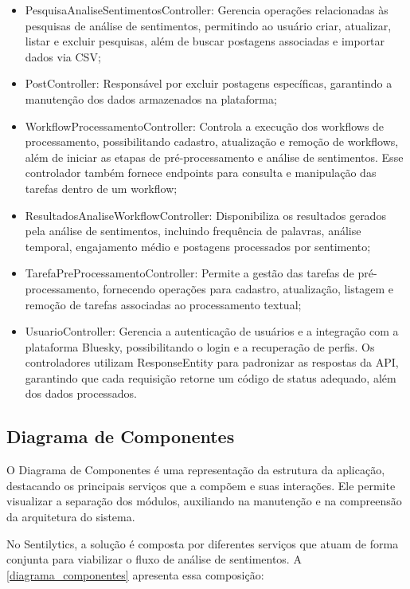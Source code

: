 \documentclass[
	12pt,				%
	oneside,			%
	a4paper,			%
	english,			%
	french,				%
	spanish,			%
	brazil				%
	]{abntex2}
\begin{document}
\begin{itemize}
\tightlist
\item
  PesquisaAnaliseSentimentosController: Gerencia operações relacionadas
  às pesquisas de análise de sentimentos, permitindo ao usuário criar,
  atualizar, listar e excluir pesquisas, além de buscar postagens
  associadas e importar dados via CSV;
\item
  PostController: Responsável por excluir postagens específicas,
  garantindo a manutenção dos dados armazenados na plataforma;
\item
  WorkflowProcessamentoController: Controla a execução dos workflows de
  processamento, possibilitando cadastro, atualização e remoção de
  workflows, além de iniciar as etapas de pré-processamento e análise de
  sentimentos. Esse controlador também fornece endpoints para consulta e
  manipulação das tarefas dentro de um workflow;
\item
  ResultadosAnaliseWorkflowController: Disponibiliza os resultados
  gerados pela análise de sentimentos, incluindo frequência de palavras,
  análise temporal, engajamento médio e postagens processados por
  sentimento;
\item
  TarefaPreProcessamentoController: Permite a gestão das tarefas de
  pré-processamento, fornecendo operações para cadastro, atualização,
  listagem e remoção de tarefas associadas ao processamento textual;
\item
  UsuarioController: Gerencia a autenticação de usuários e a integração
  com a plataforma Bluesky, possibilitando o login e a recuperação de
  perfis. Os controladores utilizam ResponseEntity para padronizar as
  respostas da API, garantindo que cada requisição retorne um código de
  status adequado, além dos dados processados.
\end{itemize}

\hypertarget{diagrama-de-componentes}{%
\subsection{Diagrama de Componentes}\label{diagrama-de-componentes}}

O Diagrama de Componentes é uma representação da estrutura da aplicação,
destacando os principais serviços que a compõem e suas interações. Ele
permite visualizar a separação dos módulos, auxiliando na manutenção e
na compreensão da arquitetura do sistema.

No Sentilytics, a solução é composta por diferentes serviços que atuam
de forma conjunta para viabilizar o fluxo de análise de sentimentos. A
\autoref{diagrama_componentes} apresenta essa composição:
\end{document}

